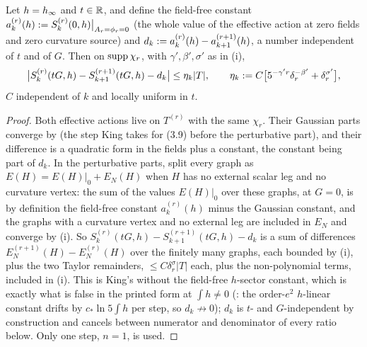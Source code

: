 \begin{proposition}\label{rot:prop:H6I3}
Let $h=h_\infty$ and $t\in\mathbb R$, and define the field-free constant $a^{(r)}_k(h):= S^{(r)}_k(0,h)\big|_{A_r=\phi_r=0}$ (the whole value of the effective action at zero fields and zero curvature source) and $d_k:= a^{(r)}_k(h)-a^{(r+1)}_{k+1}(h)$, a number independent of $t$ and of $G$. Then on $\operatorname{supp}\chi_r$, with $\gamma',\beta',\sigma'$ as in (i),
\[
\big|S^{(r)}_k(tG,h)-S^{(r+1)}_{k+1}(tG,h)-d_k\big|\le\eta_k|T|,\qquad\eta_k:= C\big[5^{-\gamma'r}\delta_r^{-\beta'}+\delta_r^{\sigma'}\big],
\]
$C$ independent of $k$ and locally uniform in $t$.
\end{proposition}
\begin{proof}
Both effective actions live on $T^{(r)}$ with the same $\chi_r$. Their Gaussian parts converge by \cite[Thm.~3.3]{K1} (the step King takes for (3.9) before the perturbative part), and their difference is a quadratic form in the fields plus a constant, the constant being part of $d_k$. In the perturbative parts, split every graph as $E(H)=E(H)|_0+E_N(H)$ when $H$ has no external scalar leg and no curvature vertex: the sum of the values $E(H)|_0$ over these graphs, at $G=0$, is by definition the field-free constant $a^{(r)}_k(h)$ minus the Gaussian constant, and the graphs with a curvature vertex and no external leg are included in $E_N$ and converge by (i). So $S^{(r)}_k(tG,h)-S^{(r+1)}_{k+1}(tG,h)-d_k$ is a sum of differences $E^{(r+1)}_N(H)-E^{(r)}_N(H)$ over the finitely many graphs, each bounded by (i), plus the two Taylor remainders, $\le C\delta_r^\sigma|T|$ each, plus the non-polynomial terms, included in (i). This is King's \cite[(3.9)]{K1} without the field-free $h$-sector constant, which is exactly what is false in the printed form at $\int h\ne0$ (: the order-$e^2$ $h$-linear constant drifts by $c_*\ln5\int h$ per step, so $d_k\not\to0$); $d_k$ is $t$- and $G$-independent by construction and cancels between numerator and denominator of every ratio below. Only one step, $n=1$, is used.
\end{proof}
